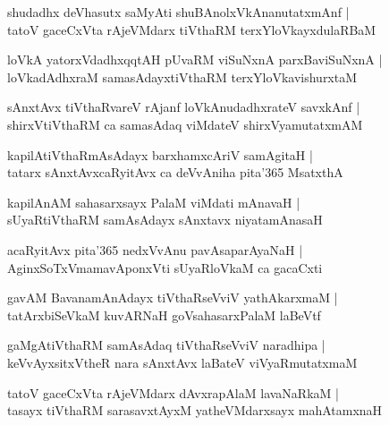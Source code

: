 \documentclass[twoside,12pt,openright]{book}
\newcounter{shloka}[chapter]
\begin{document}
\begin{shloka}
shudadhx deVhasutx saMyAti shuBAnolxVkAnanutatxmAnf |\\
tatoV gaceCxVta rAjeVMdarx tiVthaRM terxYloVkayxdulaRBaM 
\end{shloka}

\begin{shloka}
loVkA yatorxVdadhxqqtAH pUvaRM viSuNxnA parxBaviSuNxnA |\\
loVkadAdhxraM samasAdayxtiVthaRM terxYloVkavishurxtaM 
\end{shloka}

\begin{shloka}
sAnxtAvx tiVthaRvareV rAjanf loVkAnudadhxrateV savxkAnf |\\
shirxVtiVthaRM ca samasAdaq viMdateV shirxVyamutatxmAM 
\end{shloka}

\begin{shloka}
kapilAtiVthaRmAsAdayx barxhamxcAriV samAgitaH |\\
tatarx sAnxtAvxcaRyitAvx ca deVvAniha pita\char'365 MsatxthA
\end{shloka}

\begin{shloka}
kapilAnAM sahasarxsayx PalaM viMdati mAnavaH |\\
sUyaRtiVthaRM samAsAdayx sAnxtavx niyatamAnasaH 
\end{shloka}

\begin{shloka}
acaRyitAvx pita\char'365 nedxVvAnu pavAsaparAyaNaH |\\
AginxSoTxVmamavAponxVti sUyaRloVkaM ca gacaCxti
\end{shloka}

\begin{shloka}
gavAM BavanamAnAdayx tiVthaRseVviV yathAkarxmaM |\\
tatArxbiSeVkaM kuvARNaH goVsahasarxPalaM laBeVtf
\end{shloka}

\begin{shloka}
gaMgAtiVthaRM samAsAdaq tiVthaRseVviV naradhipa |\\
keVvAyxsitxVtheR nara sAnxtAvx laBateV viVyaRmutatxmaM 
\end{shloka}

\begin{shloka}
tatoV gaceCxVta rAjeVMdarx dAvxrapAlaM lavaNaRkaM |\\
tasayx tiVthaRM sarasavxtAyxM yatheVMdarxsayx mahAtamxnaH 
\end{shloka}
\end{document}
